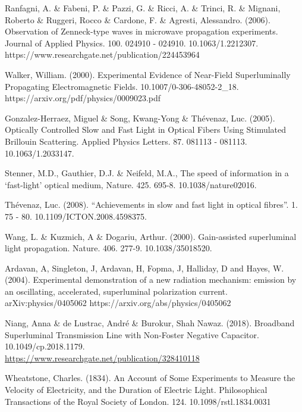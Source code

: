 \documentclass[twoside,final]{article}
\begin{document}
{\begin{thebibliography}{99}
 Ranfagni, A. \& Fabeni, P. \& Pazzi, G. \& Ricci, A. \&
Trinci, R. \& Mignani, Roberto \& Ruggeri, Rocco \& Cardone, F. \& Agresti,
Alessandro. (2006). Observation of Zenneck-type waves in microwave propagation
experiments. Journal of Applied Physics. 100. 024910 - 024910.
10.1063/1.2212307. https://www.researchgate.net/publication/224453964 

 Walker, William. (2000). Experimental Evidence of
Near-Field Superluminally Propagating Electromagnetic Fields.
10.1007/0-306-48052-2\_18. https://arxiv.org/pdf/physics/0009023.pdf



 Gonzalez-Herraez, Miguel \& Song, Kwang-Yong \&
Th\'evenaz, Luc. (2005). Optically Controlled Slow and Fast Light in Optical
Fibers Using Stimulated Brillouin Scattering. Applied Physics Letters. 87.
081113 - 081113. 10.1063/1.2033147. 


 Stenner, M.D., Gauthier, D.J. \& Neifeld, M.A., The speed
of information in a `fast-light' optical medium, Nature. 425. 695-8.
10.1038/nature02016. 


 Th\'evenaz, Luc. (2008). ``Achievements in slow and fast
light in optical fibres''. 1. 75 - 80. 10.1109/ICTON.2008.4598375. 

 Wang, L. \& Kuzmich, A \& Dogariu, Arthur. (2000). Gain-assisted
superluminal light propagation. Nature. 406. 277-9. 10.1038/35018520. 




 Ardavan, A, Singleton, J, Ardavan, H,  Fopma, J, Halliday,
D and Hayes, W. (2004). Experimental demonstration of a new radiation mechanism:
emission by an oscillating, accelerated, superluminal polarization current.
arXiv:physics/0405062 https://arxiv.org/abs/physics/0405062

 Niang, Anna \& de Lustrac, Andr\'e \& Burokur, Shah Nawaz.
(2018). Broadband Superluminal Transmission Line with Non-Foster Negative
Capacitor. 10.1049/cp.2018.1179.\\
\url{https://www.researchgate.net/publication/328410118}

 Wheatstone, Charles. (1834). An Account of Some
Experiments to Measure the Velocity of Electricity, and the Duration of Electric
Light. Philosophical Transactions of the Royal Society of London. 124.
10.1098/rstl.1834.0031


\end{thebibliography}}
\end{document}
